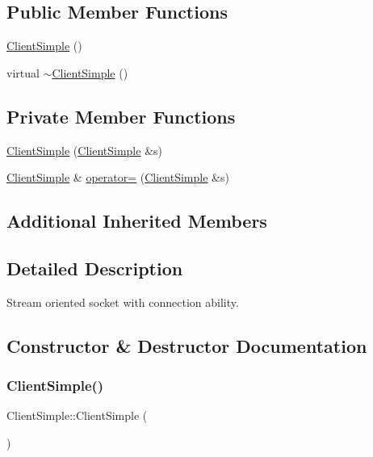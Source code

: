 \subsection*{Public Member Functions}
\begin{DoxyCompactItemize}
\item 
\hyperlink{classClientSimple_a29949bd6c34b124b0ced310e9b400664}{Client\+Simple} ()
\item 
virtual \hyperlink{classClientSimple_ae095fffdeca191749c72be5502b7b64b}{$\sim$\+Client\+Simple} ()
\end{DoxyCompactItemize}
\subsection*{Private Member Functions}
\begin{DoxyCompactItemize}
\item 
\hyperlink{classClientSimple_a5ef01407050f965155efe56ad1338ad3}{Client\+Simple} (\hyperlink{classClientSimple}{Client\+Simple} \&s)
\item 
\hyperlink{classClientSimple}{Client\+Simple} \& \hyperlink{classClientSimple_a59b6462085e8ac3aa1b634f28fe7efb4}{operator=} (\hyperlink{classClientSimple}{Client\+Simple} \&s)
\end{DoxyCompactItemize}
\subsection*{Additional Inherited Members}


\subsection{Detailed Description}
Stream oriented socket with connection ability. 

\subsection{Constructor \& Destructor Documentation}
\mbox{\label{classClientSimple_a29949bd6c34b124b0ced310e9b400664}} 
\subsubsection{\texorpdfstring{Client\+Simple()}{ClientSimple()}\hspace{0.1cm}{\footnotesize\ttfamily [1/2]}}
{\footnotesize\ttfamily Client\+Simple\+::\+Client\+Simple (\begin{DoxyParamCaption}{ }\end{DoxyParamCaption})\hspace{0.3cm}{\ttfamily [inline]}}

